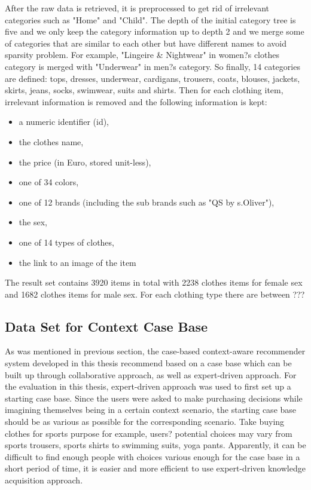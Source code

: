 After the raw data is retrieved, it is preprocessed to get rid of irrelevant categories such as "Home" and "Child". The depth of the initial category tree is five and we only keep the category information up to depth 2 and we merge some of categories that are similar to each other but have different names to avoid sparsity problem. For example, "Lingeire \& Nightwear" in women?s clothes category is merged with "Underwear" in men?s category. So finally, 14 categories are defined: tops, dresses, underwear, cardigans, trousers, coats, blouses, jackets, skirts, jeans, socks, swimwear, suits and shirts. Then for each clothing item, irrelevant information is removed and the following information is kept:
\begin{itemize}
	\item{a numeric identifier (id),}
	\item{the clothes name,}
	\item{the price (in Euro, stored unit-less),}
	\item{one of 34 colors,}
	\item{one of 12 brands (including the sub brands such as "QS by s.Oliver"),}
	\item{the sex,}
	\item{one of 14 types of clothes,}
	\item{the link to an image of the item}
\end{itemize}

The result set contains 3920 items in total with 2238 clothes items for female sex and 1682 clothes items for male sex. For each clothing type there are between  ???

\subsection{Data Set for Context Case Base} \label{sec:ds_ccb}

As was mentioned in previous section, the case-based context-aware recommender system developed in this thesis recommend based on a case base which can be built up through collaborative approach, as well as expert-driven approach. For the evaluation in this thesis, expert-driven approach was used to first set up a starting case base. Since the users were asked to make purchasing decisions while imagining themselves being in a certain context scenario, the starting case base should be as various as possible for the corresponding scenario. Take buying clothes for sports purpose for example, users? potential choices may vary from sports trousers, sports shirts to swimming suits, yoga pants. Apparently, it can be difficult to find enough people with choices various enough for the case base in a short period of time, it is easier and more efficient to use expert-driven knowledge acquisition approach.

